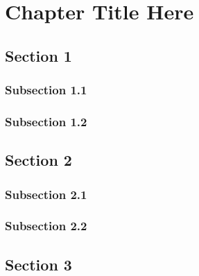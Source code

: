 
\chapter{Chapter Title Here} %

\label{chap:x}

\section{Section 1}

\subsection{Subsection 1.1}



\subsection{Subsection 1.2}



\section{Section 2}


\subsection{Subsection 2.1}


\subsection{Subsection 2.2}


\section{Section 3}
